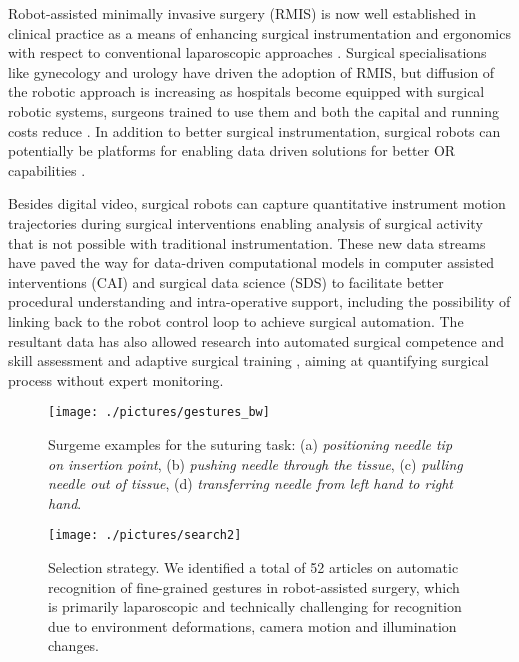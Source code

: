 \documentclass[journal]{IEEEtran}
\begin{document}
Robot-assisted minimally invasive surgery (RMIS) is now well established in clinical practice as a means of enhancing surgical instrumentation and ergonomics with respect to conventional laparoscopic approaches \cite{Moorthy2004}. Surgical specialisations like gynecology and urology have driven the adoption of RMIS, but diffusion of the robotic approach is increasing as hospitals become equipped with surgical robotic systems, surgeons trained to use them and both the capital and running costs reduce \cite{Sheetz2020}. In addition to better surgical instrumentation, surgical robots can potentially be platforms for enabling data driven solutions for better OR capabilities \cite{Chadebecq2020}.

Besides digital video, surgical robots can capture quantitative instrument motion trajectories during surgical interventions enabling analysis of surgical activity that is not possible with traditional instrumentation.
These new data streams have paved the way for data-driven computational models in computer assisted interventions (CAI) and surgical data science (SDS) \cite{Maier2017} to facilitate better procedural understanding and intra-operative support, including the possibility of linking back to the robot control loop to achieve surgical automation. 
The resultant data has also allowed research into automated surgical competence and skill assessment \cite{Rosen2001, Rosen2002, Reiley2009} and adaptive surgical training \cite{Vaughan2016}, aiming at quantifying surgical process without expert monitoring.

\begin{figure}[t!]
	\centering
	\texttt{[image: ./pictures/gestures\_bw]}
	\caption[Surgeme examples.]{Surgeme examples for the suturing task: (a) \textit{positioning needle tip on insertion point}, (b) \textit{pushing needle through the tissue}, (c) \textit{pulling needle out of tissue}, (d) \textit{transferring needle from left hand to right hand}.}
	\label{fig:surgeme}
\end{figure}

\begin{figure}[t]
	\centering
	\texttt{[image: ./pictures/search2]}
	\caption[Selection strategy.]{Selection strategy. We identified a total of 52 articles on automatic recognition of fine-grained gestures in robot-assisted surgery, which is primarily laparoscopic and technically challenging for recognition due to environment deformations, camera motion and illumination changes.}
	\label{fig:searchSchema}
\end{figure}
\end{document}
